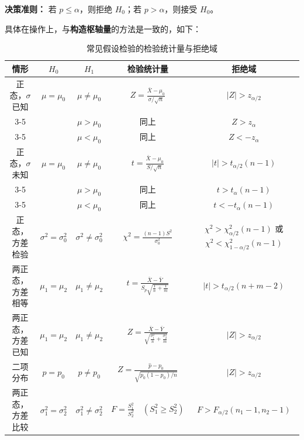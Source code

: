 \documentclass[a4paper]{ctexart}
\begin{document}
\textbf{决策准则：} 若 $p \leq \alpha$，则拒绝 $H_0$；若 $p > \alpha$，则接受 $H_0$。

具体在操作上，与\textbf{构造枢轴量}的方法是一致的，如下：

\begin{table}[h]
\centering
\caption{常见假设检验的检验统计量与拒绝域}
\begin{tabular}{|c|c|c|c|c|}
\hline
\textbf{情形} & \(H_0\) & \(H_1\) & \textbf{检验统计量} & \textbf{拒绝域} \\
\hline
\hline
正态，\(\sigma\) 已知 & \(\mu = \mu_0\) & \(\mu \neq \mu_0\) & \(\displaystyle Z = \frac{\bar{X} - \mu_0}{\sigma / \sqrt{n}}\) & \(|Z| > z_{\alpha/2}\) \\
\cline{3-5}
 & & \(\mu > \mu_0\) & 同上 & \(Z > z_{\alpha}\) \\
\cline{3-5}
 & & \(\mu < \mu_0\) & 同上 & \(Z < -z_{\alpha}\) \\
\hline
正态，\(\sigma\) 未知 & \(\mu = \mu_0\) & \(\mu \neq \mu_0\) & \(\displaystyle t = \frac{\bar{X} - \mu_0}{S / \sqrt{n}}\) & \(|t| > t_{\alpha/2}(n-1)\) \\
\cline{3-5}
 & & \(\mu > \mu_0\) & 同上 & \(t > t_{\alpha}(n-1)\) \\
\cline{3-5}
 & & \(\mu < \mu_0\) & 同上 & \(t < -t_{\alpha}(n-1)\) \\
\hline
正态，方差检验 & \(\sigma^2 = \sigma_0^2\) & \(\sigma^2 \neq \sigma_0^2\) & \(\displaystyle \chi^2 = \frac{(n-1)S^2}{\sigma_0^2}\) & \(\chi^2 > \chi_{\alpha/2}^2(n-1)\) 或 \(\chi^2 < \chi_{1-\alpha/2}^2(n-1)\) \\
\hline
两正态，方差相等 & \(\mu_1 = \mu_2\) & \(\mu_1 \neq \mu_2\) & \(\displaystyle t = \frac{\bar{X} - \bar{Y}}{S_p \sqrt{\frac{1}{n} + \frac{1}{m}}}\) & \(|t| > t_{\alpha/2}(n+m-2)\) \\
\hline
两正态，方差已知 & \(\mu_1 = \mu_2\) & \(\mu_1 \neq \mu_2\) & \(\displaystyle Z = \frac{\bar{X} - \bar{Y}}{\sqrt{\frac{\sigma_1^2}{n} + \frac{\sigma_2^2}{m}}}\) & \(|Z| > z_{\alpha/2}\) \\
\hline
二项分布 & \(p = p_0\) & \(p \neq p_0\) & \(\displaystyle Z = \frac{\hat{p} - p_0}{\sqrt{p_0(1-p_0)/n}}\) & \(|Z| > z_{\alpha/2}\) \\
\hline
两正态，方差比较 & \(\sigma_1^2 = \sigma_2^2\) & \(\sigma_1^2 \neq \sigma_2^2\) & \(\displaystyle F = \frac{S_1^2}{S_2^2} \quad (S_1^2 \geq S_2^2)\) & \(F > F_{\alpha/2}(n_1-1, n_2-1)\) \\
\hline
\end{tabular}
\end{table}
\end{document}
